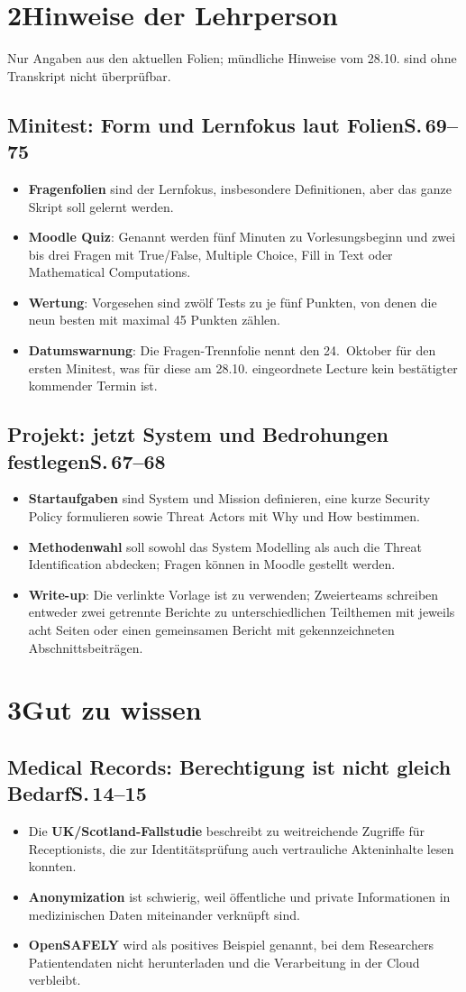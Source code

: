 \documentclass[11pt,a4paper]{article}
\newcommand{\block}[2]{\subsection*{#1\hfill{\normalfont\small #2}}}
\begin{document}
\newpage
\section*{2\quad Hinweise der Lehrperson}
{\small Nur Angaben aus den aktuellen Folien; mündliche Hinweise vom 28.10. sind ohne Transkript nicht überprüfbar.}

\block{Minitest: Form und Lernfokus laut Folien}{S.\,69--75}
\begin{itemize}
\item \textbf{Fragenfolien} sind der Lernfokus, insbesondere Definitionen, aber das ganze Skript soll gelernt werden.
\item \textbf{Moodle Quiz}: Genannt werden fünf Minuten zu Vorlesungsbeginn und zwei bis drei Fragen mit True/False, Multiple Choice, Fill in Text oder Mathematical Computations.
\item \textbf{Wertung}: Vorgesehen sind zwölf Tests zu je fünf Punkten, von denen die neun besten mit maximal 45 Punkten zählen.
\item \textbf{Datumswarnung}: Die Fragen-Trennfolie nennt den 24.~Oktober für den ersten Minitest, was für diese am 28.10. eingeordnete Lecture kein bestätigter kommender Termin ist.
\end{itemize}

\block{Projekt: jetzt System und Bedrohungen festlegen}{S.\,67--68}
\begin{itemize}
\item \textbf{Startaufgaben} sind System und Mission definieren, eine kurze Security Policy formulieren sowie Threat Actors mit Why und How bestimmen.
\item \textbf{Methodenwahl} soll sowohl das System Modelling als auch die Threat Identification abdecken; Fragen können in Moodle gestellt werden.
\item \textbf{Write-up}: Die verlinkte Vorlage ist zu verwenden; Zweierteams schreiben entweder zwei getrennte Berichte zu unterschiedlichen Teilthemen mit jeweils acht Seiten oder einen gemeinsamen Bericht mit gekennzeichneten Abschnittsbeiträgen.
\end{itemize}

\section*{3\quad Gut zu wissen}
\block{Medical Records: Berechtigung ist nicht gleich Bedarf}{S.\,14--15}
\begin{itemize}
\item Die \textbf{UK/Scotland-Fallstudie} beschreibt zu weitreichende Zugriffe für Receptionists, die zur Identitätsprüfung auch vertrauliche Akteninhalte lesen konnten.
\item \textbf{Anonymization} ist schwierig, weil öffentliche und private Informationen in medizinischen Daten miteinander verknüpft sind.
\item \textbf{OpenSAFELY} wird als positives Beispiel genannt, bei dem Researchers Patientendaten nicht herunterladen und die Verarbeitung in der Cloud verbleibt.
\end{itemize}
\end{document}
